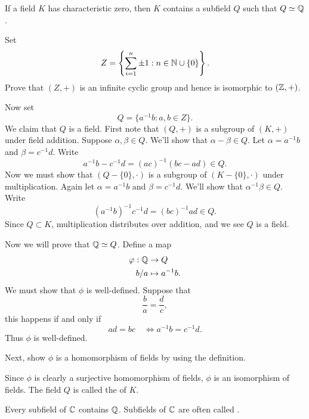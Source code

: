 \documentclass{ximera}
\begin{document}
\begin{theorem}
  If a field $K$ has characteristic zero, then $K$ contains a
  subfield $Q$ such that $Q\simeq \mathbb Q$.
  \begin{sketch}
    Set
    \[
    Z =\left\{\sum_{i=1}^n \pm 1:n\in \mathbb N\cup\{0\}\right\}.
    \]
    Prove that $(Z,+)$ is an infinite cyclic group and hence is
    isomorphic to $(\mathbb Z,+)$.

    Now set
    \[
    Q = \{a^{-1}b : a,b\in Z\}.
    \]
    We claim that $Q$ is a field. First note that $(Q,+)$ is a subgroup of
    $(K,+)$ under field addition. Suppose $\alpha,\beta\in Q$. We'll
    show that $\alpha-\beta\in Q$. Let $\alpha = a^{-1}b$ and $\beta=
    c^{-1}d$. Write
    \[
    a^{-1}b - c^{-1} d = (ac)^{-1}(bc- ad)\in Q.
    \]
    Now we must show that $(Q-\{0\},\cdot)$ is a subgroup of
    $(K-\{0\},\cdot)$ under multiplication. Again let $\alpha = a^{-1}b$
    and $\beta= c^{-1}d$. We'll show that $\alpha^{-1}\beta \in
    Q$. Write
    \[
    (a^{-1}b)^{-1} c^{-1}d = (bc)^{-1} ad\in Q.
    \]
    Since $Q\subset K$, multiplication distributes over addition, and
    we see $Q$ is a field.

    Now we will prove that $\mathbb Q\simeq Q$. Define a map
    \begin{align*}
      \varphi: \mathbb Q &\to Q\\
      b/a &\mapsto a^{-1} b.
    \end{align*}
    We must show that $\phi$ is well-defined.
    Suppose that
    \[
    \frac{b}{a} = \frac{d}{c},
    \]
    this happens if and only if
    \[
    ad = bc\quad\Leftrightarrow a^{-1} b = c^{-1} d.
    \]
    Thus $\phi$ is well-defined.

    Next, show $\phi$ is a homomorphism of fields by using the
    definition.


    Since $\phi$ is clearly a surjective homomorphism of fields,
    $\phi$ is an isomorphism of fields. The field $Q$ is called the
     of $K$.
  \end{sketch}
\end{theorem}

\begin{corollary}
  Every subfield of $\mathbb C$ contains $\mathbb Q$. Subfields of $\mathbb C$ are often
  called .
\end{corollary}
\end{document}
